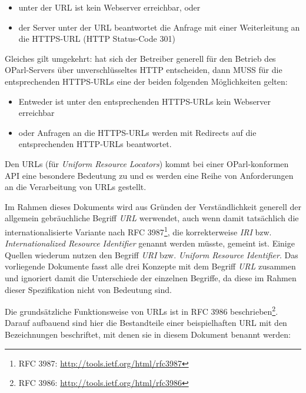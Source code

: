 \documentclass[,a4paper]{article}
\begin{document}
\begin{itemize}
\item
  unter der URL ist kein Webserver erreichbar, oder
\item
  der Server unter der URL beantwortet die Anfrage mit einer
  Weiterleitung an die HTTPS-URL (HTTP Status-Code 301)
\end{itemize}

Gleiches gilt umgekehrt: hat sich der Betreiber generell für den Betrieb
des OParl-Servers über unverschlüsseltes HTTP entscheiden, dann MUSS für
die entsprechenden HTTPS-URLs eine der beiden folgenden Möglichkeiten
gelten:

\begin{itemize}
\item
  Entweder ist unter den entsprechenden HTTPS-URLs kein Webserver
  erreichbar
\item
  oder Anfragen an die HTTPS-URLs werden mit Redirects auf die
  entsprechenden HTTP-URLs beantwortet.
\end{itemize}


Den URLs (für \emph{Uniform Resource Locators}) kommt bei einer
OParl-konformen API eine besondere Bedeutung zu und es werden eine Reihe
von Anforderungen an die Verarbeitung von URLs gestellt.

Im Rahmen dieses Dokuments wird aus Gründen der Verständlichkeit
generell der allgemein gebräuchliche Begriff \emph{URL} werwendet, auch
wenn damit tatsächlich die internationalisierte Variante nach RFC
3987\footnote{RFC 3987: \url{http://tools.ietf.org/html/rfc3987}}, die
korrekterweise \emph{IRI} bzw. \emph{Internationalized Resource
Identifier} genannt werden müsste, gemeint ist. Einige Quellen wiederum
nutzen den Begriff \emph{URI} bzw. \emph{Uniform Resource Identifier}.
Das vorliegende Dokumente fasst alle drei Konzepte mit dem Begriff
\emph{URL} zusammen und ignoriert damit die Unterschiede der einzelnen
Begriffe, da diese im Rahmen dieser Spezifikation nicht von Bedeutung
sind.

Die grundsätzliche Funktionsweise von URLs ist in RFC 3986
beschrieben\footnote{RFC 3986: \url{http://tools.ietf.org/html/rfc3986}}.
Darauf aufbauend sind hier die Bestandteile einer beispielhaften URL mit
den Bezeichnungen beschriftet, mit denen sie in diesem Dokument benannt
werden:
\end{document}

